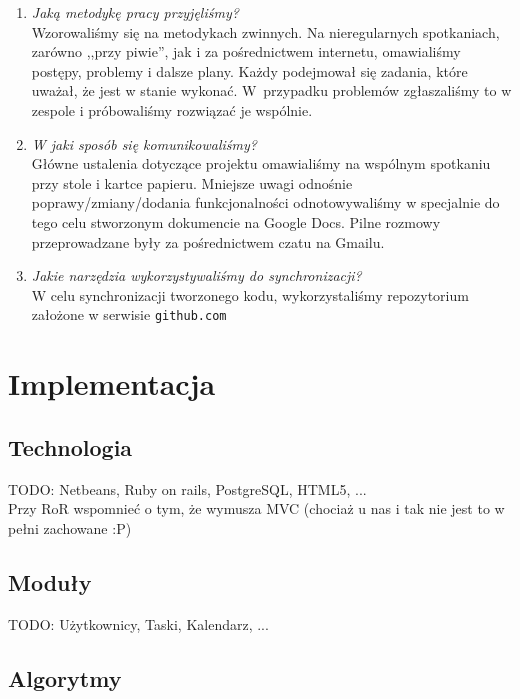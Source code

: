 \documentclass[pdflatex,11pt]{aghdpl}
\begin{document}
\begin{enumerate}
\item \textit{Jaką metodykę pracy przyjęliśmy?}\\
Wzorowaliśmy się na metodykach zwinnych. Na nieregularnych spotkaniach, zarówno ,,przy piwie'', jak i za pośrednictwem internetu, omawialiśmy postępy, problemy i dalsze plany. Każdy podejmował się zadania, które uważał, że jest w stanie wykonać. W~przypadku problemów zgłaszaliśmy to w zespole i próbowaliśmy rozwiązać je wspólnie.

\item \textit{W jaki sposób się komunikowaliśmy?}\\
Główne ustalenia dotyczące projektu omawialiśmy na wspólnym spotkaniu przy stole i kartce papieru. Mniejsze uwagi odnośnie poprawy/zmiany/dodania funkcjonalności odnotowywaliśmy w specjalnie do tego celu stworzonym dokumencie na Google Docs. Pilne rozmowy przeprowadzane były za pośrednictwem czatu na Gmailu.

\item \textit{Jakie narzędzia wykorzystywaliśmy do synchronizacji?}\\
W celu synchronizacji tworzonego kodu, wykorzystaliśmy repozytorium założone w serwisie \texttt{github.com}

\end{enumerate}



\chapter{Implementacja}

\section{Technologia}

TODO: Netbeans, Ruby on rails, PostgreSQL, HTML5, ...\\
Przy RoR wspomnieć o tym, że wymusza MVC (chociaż u nas i tak nie jest to w pełni zachowane :P)

\section{Moduły}

TODO: Użytkownicy, Taski, Kalendarz, ...

\section{Algorytmy}
\end{document}
